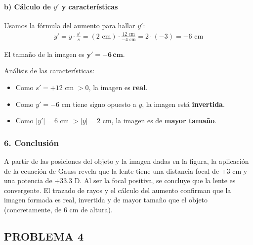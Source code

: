 \paragraph*{b) Cálculo de $y'$ y características}
Usamos la fórmula del aumento para hallar $y'$:
\begin{gather}
    y' = y \cdot \frac{s'}{s} = (2 \text{ cm}) \cdot \frac{12 \text{ cm}}{-4 \text{ cm}} = 2 \cdot (-3) = -6 \text{ cm}
\end{gather}
\begin{cajaresultado}
    El tamaño de la imagen es $\boldsymbol{y' = -6 \, \textbf{cm}}$.
\end{cajaresultado}
Análisis de las características:
\begin{itemize}
    \item Como $s'=+12$ cm $> 0$, la imagen es \textbf{real}.
    \item Como $y'=-6$ cm tiene signo opuesto a $y$, la imagen está \textbf{invertida}.
    \item Como $|y'|=6$ cm $> |y|=2$ cm, la imagen es de \textbf{mayor tamaño}.
\end{itemize}

\subsubsection*{6. Conclusión}
\begin{cajaconclusion}
A partir de las posiciones del objeto y la imagen dadas en la figura, la aplicación de la ecuación de Gauss revela que la lente tiene una distancia focal de +3 cm y una potencia de +33.3 D. Al ser la focal positiva, se concluye que la lente es convergente. El trazado de rayos y el cálculo del aumento confirman que la imagen formada es real, invertida y de mayor tamaño que el objeto (concretamente, de 6 cm de altura).
\end{cajaconclusion}

\newpage
\subsection{PROBLEMA 4}
\label{subsec:P4_2024_jun_ord}

